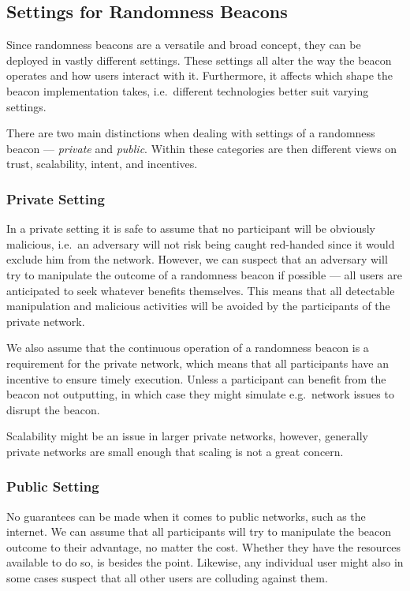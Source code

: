 \subsection{Settings for Randomness Beacons}
Since randomness beacons are a versatile and broad concept, they can be deployed in vastly different settings.
These settings all alter the way the beacon operates and how users interact with it.
Furthermore, it affects which shape the beacon implementation takes, i.e.\ different technologies better suit varying settings.

There are two main distinctions when dealing with settings of a randomness beacon --- \emph{private} and \emph{public}.
Within these categories are then different views on trust, scalability, intent, and incentives.

\subsubsection{Private Setting}
In a private setting it is safe to assume  that no participant will be obviously malicious, i.e.\ an adversary will not risk being caught red-handed since it would exclude him from the network.
However, we can suspect that an adversary will try to manipulate the outcome of a randomness beacon if possible --- all users are anticipated to seek whatever benefits themselves.
This means that all detectable manipulation and malicious activities will be avoided by the participants of the private network.

We also assume that the continuous operation of a randomness beacon is a requirement for the private network, which means that all participants have an incentive to ensure timely execution.
Unless a participant can benefit from the beacon not outputting, in which case they might simulate e.g.\ network issues to disrupt the beacon.

Scalability might be an issue in larger private networks, however, generally private networks are small enough that scaling is not a great concern.

\subsubsection{Public Setting}
No guarantees can be made when it comes to public networks, such as the internet.
We can assume that all participants will try to manipulate the beacon outcome to their advantage, no matter the cost.
Whether they have the resources available to do so, is besides the point.
Likewise, any individual user might also in some cases suspect that all other users are colluding against them.

